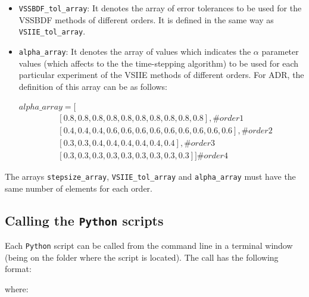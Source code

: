 \documentclass[preprint,1p]{article}
\begin{document}
\begin{itemize}
\item{\tt VSSBDF\_tol\_array}: It denotes the array of error tolerances to be used for the VSSBDF 
methods of different orders. It is defined in the same way as {\tt VSIIE\_tol\_array}. 


\item {\tt alpha\_array}: It denotes the array of values which indicates the $\alpha$ parameter values (which affects to the the time-stepping 
algorithm) to be used for each particular experiment of the  VSIIE methods of different orders.
For ADR, the definition of this array can be as follows:

\begin{small}
$alpha\_array=[$
\begin{align*}
	&[0.8, 0.8, 0.8, 0.8, 0.8, 0.8, 0.8, 0.8, 0.8, 0.8],   \#order 1\\
	&[0.4, 0.4, 0.4, 0.6, 0.6, 0.6, 0.6, 0.6, 0.6, 0.6, 0.6, 0.6], \#order 2\\
	&[0.3, 0.3, 0.4, 0.4, 0.4, 0.4, 0.4, 0.4], \#order 3 \\
	&[0.3, 0.3, 0.3, 0.3, 0.3, 0.3, 0.3, 0.3, 0.3 ]]  \#order 4			
\end{align*}
\end{small}

\end{itemize}

The arrays {\tt stepsize\_array}, {\tt VSIIE\_tol\_array} and {\tt alpha\_array} must have the same number of elements for each order.


\subsection{Calling the \texttt{Python} scripts}
Each \texttt{Python} script can be called from the command line in a terminal window (being on the folder where the script is located).  
The call has the following format:


\vspace{0.3cm}

\vspace{0.3cm}
\noindent where:
\end{document}
